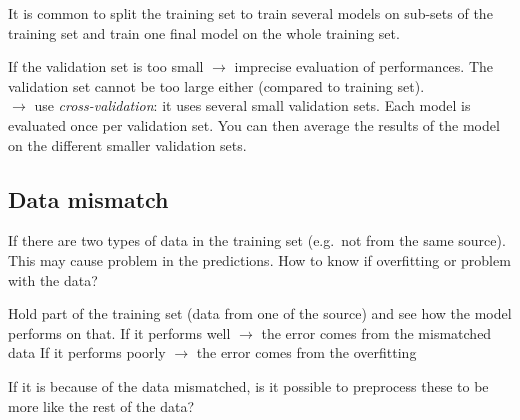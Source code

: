 It is common to split the training set to train several models on sub-sets of the training set and train one final model on the whole training set.

If the validation set is too small $\rightarrow$ imprecise evaluation of performances.
The validation set cannot be too large either (compared to training set).\\
$\rightarrow$ use \emph{cross-validation}: it uses several small validation sets.
Each model is evaluated once per validation set.
You can then average the results of the model on the different smaller validation sets.

\subsection{Data mismatch}
If there are two types of data in the training set (e.g.\ not from the same source).
This may cause problem in the predictions.
How to know if overfitting or problem with the data?

Hold part of the training set (data from one of the source) and see how the model performs on that.
If it performs well $\rightarrow$ the error comes from the mismatched data
If it performs poorly $\rightarrow$ the error comes from the overfitting

If it is because of the data mismatched, is it possible to preprocess these to be more like the rest of the data?
